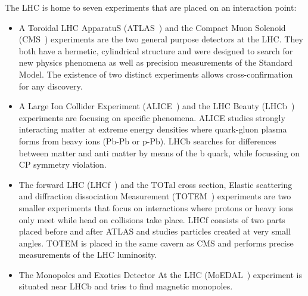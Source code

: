 The LHC is home to seven experiments that are placed on an interaction point: 
\begin{itemize}
	\item A Toroidal LHC ApparatuS (ATLAS~\cite{Aad:2008zzm}) and the Compact Muon Solenoid (CMS~\cite{Chatrchyan:2008aa}) experiments are the two general purpose detectors at the LHC. They both have a hermetic, cylindrical structure and were designed to search for new physics phenomena as well as precision measurements of the Standard Model. The existence of two distinct experiments allows cross-confirmation for any discovery. 
	\item A Large Ion Collider Experiment (ALICE~\cite{Aamodt:2008zz}) and the LHC Beauty (LHCb~\cite{Alves:2008zz}) experiments are focusing on specific phenomena. ALICE studies strongly interacting matter at extreme energy densities where quark-gluon plasma forms from heavy ions (Pb-Pb or p-Pb). LHCb searches for differences between matter and anti matter by means of the b quark, while focussing on CP symmetry violation.
	\item The forward LHC (LHCf~\cite{Bongi:2010zz}) and the TOTal cross section, Elastic scattering and diffraction dissociation Measurement (TOTEM~\cite{Anelli:2008zza}) experiments are two smaller experiments that focus on interactions where protons or heavy ions only meet while head on collisions take place. LHCf consists of two parts placed before and after ATLAS and studies particles created at very small angles. TOTEM is placed in the same cavern as CMS and performs precise measurements of the LHC luminosity.
		\item The Monopoles and Exotics Detector At the LHC (MoEDAL~\cite{Acharya:2014nyr}) experiment is situated near LHCb and tries to find magnetic monopoles. 
\end{itemize}


